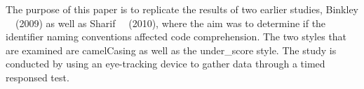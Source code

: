 The purpose of this paper is to replicate the results of two earlier studies, Binkley \etal ~~(2009) as well as Sharif \etal ~~(2010), where the aim was to determine if the identifier naming conventions affected code comprehension. The two styles that are examined are camelCasing as well as the under\_score style. The study is conducted by using an eye-tracking device to gather data through a timed responsed test. 